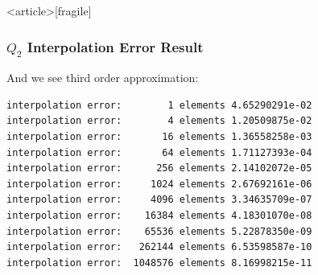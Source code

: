 \begin{frame}<article>[fragile]
\frametitle{$Q_2$ Interpolation Error Result}
And we see third order approximation:
\begin{lstlisting}[basicstyle=\scriptsize]
interpolation error:        1 elements 4.65290291e-02
interpolation error:        4 elements 1.20509875e-02
interpolation error:       16 elements 1.36558258e-03
interpolation error:       64 elements 1.71127393e-04
interpolation error:      256 elements 2.14102072e-05
interpolation error:     1024 elements 2.67692161e-06
interpolation error:     4096 elements 3.34635709e-07
interpolation error:    16384 elements 4.18301070e-08
interpolation error:    65536 elements 5.22878350e-09
interpolation error:   262144 elements 6.53598587e-10
interpolation error:  1048576 elements 8.16998215e-11
\end{lstlisting}
\end{frame}

\cleardoublepage
